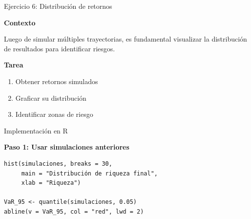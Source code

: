 \documentclass[10pt]{beamer}
\begin{document}
\begin{frame}{Ejercicio 6: Distribución de retornos}

\textbf{Contexto}

\vspace{0.2cm}
Luego de simular múltiples trayectorias, es fundamental visualizar la distribución de resultados para identificar riesgos.

\vspace{0.4cm}

\textbf{Tarea}

\begin{enumerate}
\item Obtener retornos simulados
\item Graficar su distribución
\item Identificar zonas de riesgo
\end{enumerate}

\end{frame}


\begin{frame}[fragile]{Implementación en R}

\textbf{Paso 1: Usar simulaciones anteriores}

\begin{lstlisting}
hist(simulaciones, breaks = 30,
     main = "Distribución de riqueza final",
     xlab = "Riqueza")

VaR_95 <- quantile(simulaciones, 0.05)
abline(v = VaR_95, col = "red", lwd = 2)

\end{lstlisting}
\vspace{0.4cm}



\end{frame}

\end{document}
